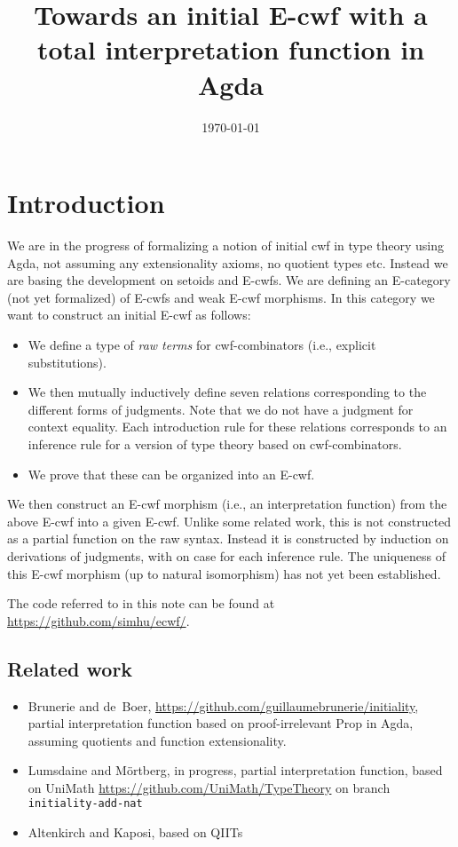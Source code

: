 \documentclass{amsart}
\title{Towards an initial E-cwf with a total interpretation function
  in Agda}
\date{\today}
\theoremstyle{plain}
\theoremstyle{definition}
\theoremstyle{remark}
\begin{document}
\maketitle

\section{Introduction}
\label{sec:introduction}

We are in the progress of formalizing a notion of initial cwf in type
theory using Agda, not assuming any extensionality axioms, no quotient
types etc.  Instead we are basing the development on setoids and
E-cwfs.  We are defining an E-category (not yet formalized) of E-cwfs
and weak E-cwf morphisms.  In this category we want to construct an
initial E-cwf as follows:
\begin{itemize}
\item We define a type of \emph{raw terms} for cwf-combinators (i.e.,
  explicit substitutions).
\item We then mutually inductively define seven relations
  corresponding to the different forms of judgments.  Note that we do
  not have a judgment for context equality.  Each introduction rule
  for these relations corresponds to an inference rule for a version
  of type theory based on cwf-combinators.
\item We prove that these can be organized into an E-cwf.
\end{itemize}
We then construct an E-cwf morphism (i.e., an interpretation function)
from the above E-cwf into a given E-cwf.  Unlike some related work,
this is not constructed as a partial function on the raw syntax.
Instead it is constructed by induction on derivations of judgments,
with on case for each inference rule.  The uniqueness of this E-cwf
morphism (up to natural isomorphism) has not yet been established.

The code referred to in this note can be found at
\url{https://github.com/simhu/ecwf/}.

\subsection{Related work}
\label{sec:related-work}

\begin{itemize}
\item Brunerie and de~Boer,
  \url{https://github.com/guillaumebrunerie/initiality}, partial
  interpretation function based on proof-irrelevant Prop in Agda,
  assuming quotients and function extensionality.
\item Lumsdaine and Mörtberg, in progress, partial interpretation
  function, based on UniMath
  \url{https://github.com/UniMath/TypeTheory} on branch
  \texttt{initiality-add-nat}
\item Altenkirch and Kaposi, based on QIITs
\end{itemize}
\end{document}
